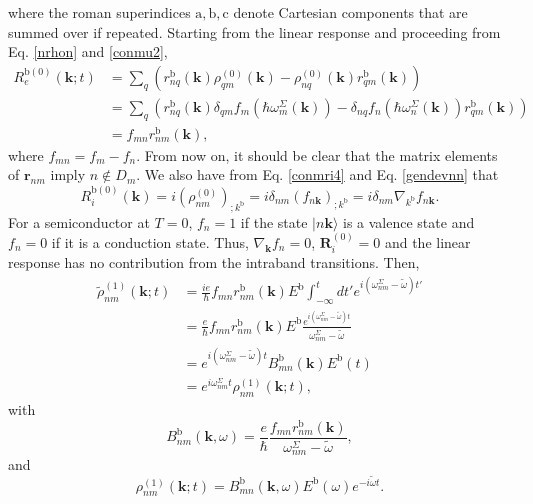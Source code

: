 where the roman superindices
$\mathrm{a},\mathrm{b},\mathrm{c}$ denote Cartesian components that are summed over if repeated.
Starting from the linear response and proceeding from Eq. \eqref{nrhon} and  \eqref{conmu2},
\begin{align}\label{R0e}
R_e^{\mathrm{b}(0)}(\mathbf{k};t)
&=
\sum_{q}
\left(
r^{\mathrm{b}}_{nq}(\mathbf{k})
\rho^{(0)}_{q m}(\mathbf{k})
-
\rho^{(0)}_{nq}(\mathbf{k})
r^{\mathrm{b}}_{q m}(\mathbf{k})
\right)
\nonumber \\
&=
\sum_{q}
\left(
r^{\mathrm{b}}_{nq}(\mathbf{k})
\delta_{q m}f_m(\hbar\omega^\Sigma_m(\mathbf{k}))
-
\delta_{nq}f_n(\hbar\omega^{\Sigma}_{n}(\mathbf{k}))
r^{\mathrm{b}}_{q m}(\mathbf{k})
\right)
\nonumber \\
&= f_{mn}r^{\mathrm{b}}_{nm}(\mathbf{k}),
\end{align}
where $f_{mn} = f_{m}-f_{n}$. From now on, it should be clear that the matrix
elements of $\mathbf{r}_{nm}$ imply $n\notin D_m$. We also have from Eq.
\eqref{conmri4} and Eq. \eqref{gendevnn} that
\begin{equation}\label{R0i}
R_i^{\mathrm{b}(0)}(\mathbf{k})
= i(\rho^{(0)}_{nm})_{;k^{\mathrm{b}}}
= i\delta_{nm}(f_{n\mathbf{k}})_{;k^{\mathrm{b}}}
= i\delta_{nm}\nabla_{k^{\mathrm{b}}} f_{n\mathbf{k}}.
\end{equation}
For a semiconductor at $T = 0$, $f_{n} = 1$ if the state $|n\mathbf{k}\rangle$
is a valence state and $f_{n} = 0$ if it is a conduction state. Thus,
$\nabla_\mathbf{k} f_{n} = 0$, $\mathbf{R}_i^{(0)} = 0$ and the linear response
has no contribution from the intraband transitions. Then,
\begin{align}\label{rtilde2n}
\tilde{\rho}^{(1)}_{nm}(\mathbf{k};t)
&= \frac{ie}{\hbar} f_{mn}
   r^{\mathrm{b}}_{nm}(\mathbf{k})E^{\mathrm{b}}
   \int_{-\infty}^{t} dt'
   e^{i(\omega^\Sigma_{nm}-\tilde{\omega})t'}\nonumber \\
&= \frac{e}{\hbar}
f_{mn}
r^{\mathrm{b}}_{nm}(\mathbf{k})E^{\mathrm{b}}
\frac{e^{i(\omega^\Sigma_{nm}-\tilde{\omega})t}}
{\omega^\Sigma_{nm}-\tilde{\omega}}
\nonumber \\
&=
e^{i(\omega^\Sigma_{nm}-\tilde{\omega})t}
B^{\mathrm{b}}_{mn}(\mathbf{k})E^{\mathrm{b}}(t)
\nonumber \\
&=
e^{i\omega^\Sigma_{nm}t}
\rho^{(1)}_{nm}(\mathbf{k};t)
,
\end{align}
with
\begin{equation}\label{rho1} 
B^{\mathrm{b}}_{nm}(\mathbf{k},\omega)=
\frac{e}{\hbar}
\frac{f_{mn}r^{\mathrm{b}}_{nm}(\mathbf{k})}
     {\omega^\Sigma_{nm}-\tilde{\omega}},
\end{equation} 
and
\begin{equation}\label{rhonoi1}
\rho^{(1)}_{nm}(\mathbf{k};t)
= B^{\mathrm{b}}_{mn}(\mathbf{k},\omega)E^{\mathrm{b}}(\omega)
  e^{-i\tilde{\omega}t}.
\end{equation}

